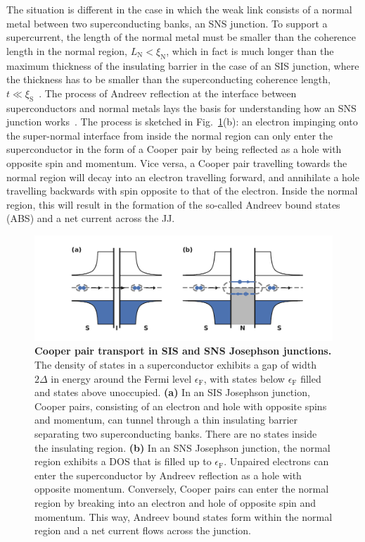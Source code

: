 The situation is different in the case in which the weak link consists of a normal metal between two superconducting banks, an SNS junction.
%
To support a supercurrent, the length of the normal metal must be smaller than the coherence length in the normal region, $L_\text{N}<\xi_\text{N}$, which in fact is much longer than the maximum thickness of the insulating barrier in the case of an SIS junction, where the thickness has to be smaller than the superconducting coherence length, $t\ll\xi_\text{S}$~\cite{caladoBallisticJosephsonJunctions2015d,benshalomQuantumOscillationsCritical2015}.
%
The process of Andreev reflection at the interface between superconductors and normal metals lays the basis for understanding how an SNS junction works~\cite{blonderTransitionMetallicTunneling1982c}.
%
The process is sketched in Fig.~\ref{fig:modelsnsdos}(b):
%
an electron impinging onto the super-normal interface from inside the normal region can only enter the superconductor in the form of a Cooper pair by being reflected as a hole with opposite spin and momentum.
%
Vice versa, a Cooper pair travelling towards the normal region will decay into an electron travelling forward, and annihilate a hole travelling backwards with spin opposite to that of the electron.
%
Inside the normal region, this will result in the formation of the so-called Andreev bound states (ABS) and a net current across the JJ.

\begin{figure}[t]
	\centering
	\includegraphics[width=\linewidth]{chapter-introduction/figs/model_SNS_DOS}
	\caption{
		\textbf{Cooper pair transport in SIS and SNS Josephson junctions.}
		The density of states in a superconductor exhibits a gap of width $2\Delta$ in energy around the Fermi level $\epsilon_\text{F}$, with states below $\epsilon_\text{F}$ filled and states above unoccupied.
		\textbf{(a)} In an SIS Josephson junction, Cooper pairs, consisting of an electron and hole with opposite spins and momentum, can tunnel through a thin insulating barrier separating two superconducting banks.
		There are no states inside the insulating region.
		\textbf{(b)} In an SNS Josephson junction, the normal region exhibits a DOS that is filled up to $\epsilon_\text{F}$.
		Unpaired electrons can enter the superconductor by Andreev reflection as a hole with opposite momentum.
		Conversely, Cooper pairs can enter the normal region by breaking into an electron and hole of opposite spin and momentum.
		This way, Andreev bound states form within the normal region and a net current flows across the junction.
	}
	\label{fig:modelsnsdos}
\end{figure}


